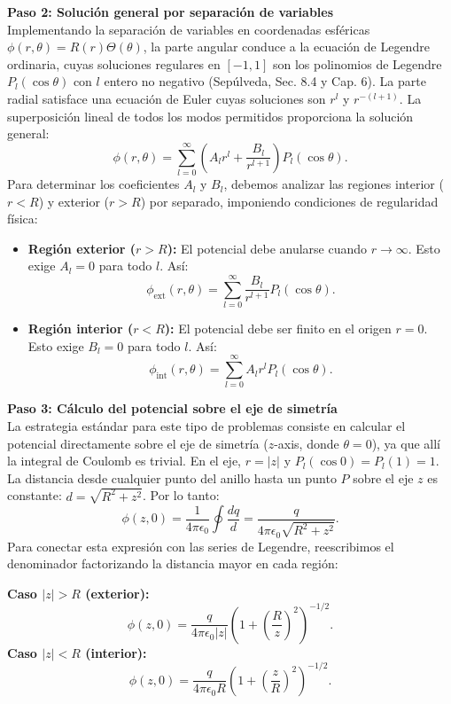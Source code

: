 \documentclass[a4paper]{article}
\begin{document}
\vspace{0.3cm}
\noindent\textbf{Paso 2: Solución general por separación de variables}\\
Implementando la separación de variables en coordenadas esféricas $\phi(r, \theta) = R(r)\Theta(\theta)$, la parte angular conduce a la ecuación de Legendre ordinaria, cuyas soluciones regulares en $[-1, 1]$ son los polinomios de Legendre $P_l(\cos\theta)$ con $l$ entero no negativo (Sepúlveda, Sec. 8.4 y Cap. 6). La parte radial satisface una ecuación de Euler cuyas soluciones son $r^l$ y $r^{-(l+1)}$. La superposición lineal de todos los modos permitidos proporciona la solución general:
$$
\phi(r, \theta) = \sum_{l=0}^{\infty} \left( A_l r^l + \frac{B_l}{r^{l+1}} \right) P_l(\cos\theta).
$$
Para determinar los coeficientes $A_l$ y $B_l$, debemos analizar las regiones interior ($r < R$) y exterior ($r > R$) por separado, imponiendo condiciones de regularidad física:
\begin{itemize}
    \item \textbf{Región exterior ($r > R$):} El potencial debe anularse cuando $r \to \infty$. Esto exige $A_l = 0$ para todo $l$. Así:
    $$
    \phi_{\text{ext}}(r, \theta) = \sum_{l=0}^{\infty} \frac{B_l}{r^{l+1}} P_l(\cos\theta).
    $$
    \item \textbf{Región interior ($r < R$):} El potencial debe ser finito en el origen $r=0$. Esto exige $B_l = 0$ para todo $l$. Así:
    $$
    \phi_{\text{int}}(r, \theta) = \sum_{l=0}^{\infty} A_l r^l P_l(\cos\theta).
    $$
\end{itemize}

\vspace{0.3cm}
\noindent\textbf{Paso 3: Cálculo del potencial sobre el eje de simetría}\\
La estrategia estándar para este tipo de problemas consiste en calcular el potencial directamente sobre el eje de simetría ($z$-axis, donde $\theta = 0$), ya que allí la integral de Coulomb es trivial. En el eje, $r = |z|$ y $P_l(\cos 0) = P_l(1) = 1$. La distancia desde cualquier punto del anillo hasta un punto $P$ sobre el eje $z$ es constante: $d = \sqrt{R^2 + z^2}$. Por lo tanto:
$$
\phi(z, 0) = \frac{1}{4\pi\epsilon_0} \oint \frac{dq}{d} = \frac{q}{4\pi\epsilon_0 \sqrt{R^2 + z^2}}.
$$
Para conectar esta expresión con las series de Legendre, reescribimos el denominador factorizando la distancia mayor en cada región:

\noindent\textbf{Caso $|z| > R$ (exterior):}
$$
\phi(z, 0) = \frac{q}{4\pi\epsilon_0 |z|} \left(1 + \left(\frac{R}{z}\right)^2\right)^{-1/2}.
$$
\noindent\textbf{Caso $|z| < R$ (interior):}
$$
\phi(z, 0) = \frac{q}{4\pi\epsilon_0 R} \left(1 + \left(\frac{z}{R}\right)^2\right)^{-1/2}.
$$
\end{document}
